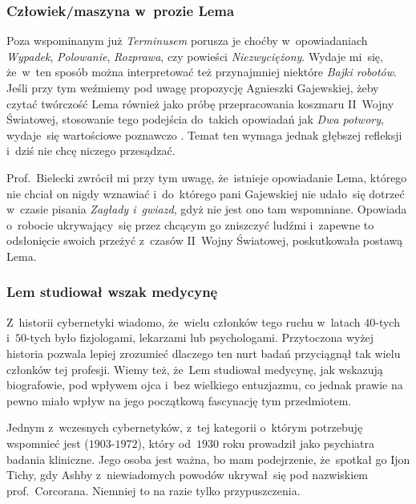 \documentclass[10pt,t]{beamer}
\begin{document}
\begin{frame}
  \frametitle{Człowiek/maszyna w~prozie Lema}


  Poza wspominanym już \textit{Terminusem} porusza je choćby w~opowiadaniach
  \textit{Wypadek}, \textit{Polowanie}, \textit{Rozprawa}, czy powieści
  \textit{Niezwyciężony}. Wydaje mi~się, że~w~ten sposób można
  interpretować też przynajmniej niektóre \textit{Bajki robotów}. Jeśli
  przy tym weźmiemy pod uwagę propozycję Agnieszki Gajewskiej, żeby czytać
  twórczość Lema również jako próbę przepracowania koszmaru II~Wojny
  Światowej, stosowanie tego podejścia do~takich opowiadań jak
  \textit{Dwa potwory}, wydaje~się wartościowe poznawczo
  \parencite{Gajewska-Zaglada-i-gwiazdy-Pub-2017}. Temat ten wymaga jednak
  głębszej refleksji i~dziś nie chcę niczego przesądzać.

  Prof.~Bielecki zwrócił mi przy tym uwagę, że~istnieje opowiadanie Lema,
  którego nie chciał on nigdy wznawiać i~do~którego pani Gajewskiej
  nie udało~się dotrzeć w~czasie pisania \textit{Zagłady i~gwiazd}, gdyż
  nie jest ono tam wspomniane. Opowiada o~robocie ukrywający~się przez
  chcącym go zniszczyć ludźmi i~zapewne to odsłonięcie swoich przeżyć
  z~czasów II~Wojny Światowej, poskutkowała postawą Lema.

\end{frame}





\begin{frame}
  \frametitle{Lem studiował wszak medycynę}


  Z~historii cybernetyki wiadomo, że~wielu członków tego ruchu w~latach
  $40$-tych i~$50$-tych było fizjologami, lekarzami lub psychologami.
  Przytoczona wyżej historia pozwala lepiej zrozumieć dlaczego ten nurt
  badań przyciągnął tak wielu członków tej profesji. Wiemy też, że~Lem
  studiował medycynę, jak wskazują biografowie, pod wpływem ojca i~bez
  wielkiego entuzjazmu, co jednak prawie na pewno miało wpływ na
  jego początkową fascynację tym przedmiotem.

  Jednym z~wczesnych cybernetyków, z~tej kategorii o~którym potrzebuję
  wspomnieć jest
   ($1903\text{-}1972$), który od~$1930$ roku prowadził
  jako psychiatra badania kliniczne. Jego osoba jest ważna, bo mam
  podejrzenie,
  że~spotkał go Ijon Tichy, gdy Ashby z~niewiadomych powodów ukrywał~się
  pod nazwiskiem prof.~Corcorana. Niemniej to na razie tylko przypuszczenia.

\end{frame}
\end{document}
